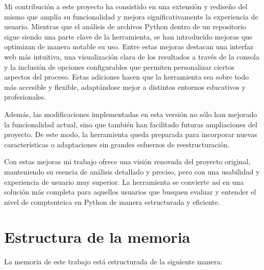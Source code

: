 \documentclass[a4paper, 12pt]{book}
\begin{document}
Mi contribución a este proyecto ha consistido en una extensión y rediseño del mismo que amplía su funcionalidad y mejora significativamente la experiencia de usuario. Mientras que el análisis de archivos Python dentro de un repositorio sigue siendo una parte clave de la herramienta, se han introducido mejoras que optimizan de manera notable su uso. Entre estas mejoras destacan una interfaz web más intuitiva, una visualización clara de los resultados a través de la consola y la inclusión de opciones configurables que permiten personalizar ciertos aspectos del proceso. Estas adiciones hacen que la herramienta sea sobre todo más accesible y flexible, adaptándose mejor a distintos entornos educativos y profesionales.

Además, las modificaciones implementadas en esta versión no sólo han mejorado la funcionalidad actual, sino que también han facilitado futuras ampliaciones del proyecto. De este modo, la herramienta queda preparada para incorporar nuevas características o adaptaciones sin grandes esfuerzos de reestructuración.

Con estas mejoras mi trabajo ofrece una visión renovada del proyecto original, manteniendo su esencia de análisis detallado y preciso, pero con una usabilidad y experiencia de usuario muy superior. La herramienta se convierte así en una solución más completa para aquellos usuarios que busquen evaluar y entender el nivel de comptenteica en Python de manera estructurada y eficiente.

\section{Estructura de la memoria}
\label{sec:estructura}


La memoria de este trabajo está estructurada de la siguiente manera:
\end{document}
